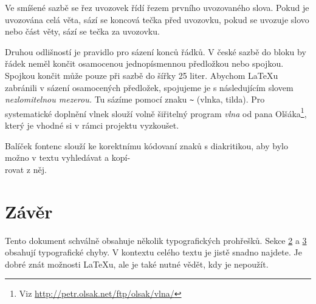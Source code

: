 \documentclass[twocolumn, 10pt,a4paper]{article}
\begin{document}
\par Ve smíšené sazbě se řez uvozovek řídí řezem prvního uvozovaného slova.
Pokud je uvozována celá věta, sází se koncová tečka před uvozovku, pokud se uvozuje slovo nebo část věty, sází se tečka za uvozovku.

\par Druhou odlišností je pravidlo pro sázení konců řádků.
V české sazbě do bloku by řádek neměl končit osamocenou jednopísmennou předložkou nebo spojkou.
Spojkou  končit může pouze při sazbě do šířky 25 liter.
Abychom \LaTeX u zabránili v sázení osamocených předložek, spojujeme je s následujícím slovem \emph{nezlomitelnou mezerou.} 
Tu sázíme pomocí znaku \verb|~| (vlnka, tilda).
Pro systematické doplnění vlnek slouží volně šiřitelný program \emph{vlna} 
od pana Olšáka\footnote[2]{Viz \href{http://petr.olsak.net/ftp/olsak/vlna/}{ http://petr.olsak.net/ftp/olsak/vlna/}}, 
který je vhodné si v rámci projektu vyzkoušet.

\par Balíček fontenc slouží ke korektnímu kódovaní znaků s diakritikou, aby bylo možno v textu vyhledávat a kopí-\\rovat z něj.

\section{Závěr}
Tento dokument schválně obsahuje několik typografických prohřešků.
Sekce \hyperref[sec:sazba]{2} a \hyperref[sec:rady]{3} obsahují typografické chyby.
V kontextu celého textu je jistě snadno najdete.
Je dobré znát možnosti \LaTeX u, ale je také nutné vědět, kdy je nepoužít.
\end{document}
